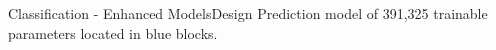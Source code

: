 \documentclass{beamer}
\begin{document}
\begin{frame}{Classification - Enhanced Models}{Design}
Prediction model of 391,325 trainable parameters located in blue blocks.	
\begin{columns}
	\begin{column}{0.2\textwidth}  %
		\begin{figure}[p]
\end{figure}
\end{column}
\end{columns}
\end{frame}
\end{document}
